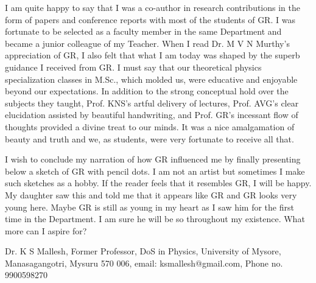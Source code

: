 I am quite happy to say that I was a co-author in research contributions in the form of papers and conference reports with most of the students of GR. I was fortunate to be selected as a faculty member in the same Department and became a junior colleague of my Teacher. When I read Dr. M V N Murthy's appreciation of GR, I also felt that what I am today was shaped by the superb guidance I received from GR. I must say that our theoretical physics specialization classes in M.Sc., which molded us, were educative and enjoyable beyond our expectations. In addition to the strong conceptual hold over the subjects they taught, Prof. KNS's artful delivery of lectures, Prof. AVG's clear elucidation assisted by beautiful handwriting, and Prof. GR's incessant flow of thoughts provided a divine treat to our minds. It was a nice amalgamation of beauty and truth and we, as students, were very fortunate to receive all that.

I wish to conclude my narration of how GR influenced me by finally presenting below a sketch of GR with pencil dots. I am not an artist but sometimes I make such sketches as a hobby. If the reader feels that it resembles GR, I will be happy. My daughter saw this and told me that it appears like GR and GR looks very young here. Maybe GR is still as young in my heart as I saw him for the first time in the Department. I am sure he will be so throughout my existence. What more can I aspire for?

\begin{figure}[H]
\end{figure}


Dr. K S Mallesh, Former Professor, DoS in Physics, University of Mysore, Manasagangotri, Mysuru 570 006, email: ksmallesh@gmail.com, Phone no. 9900598270


\vspace{.5cm}

